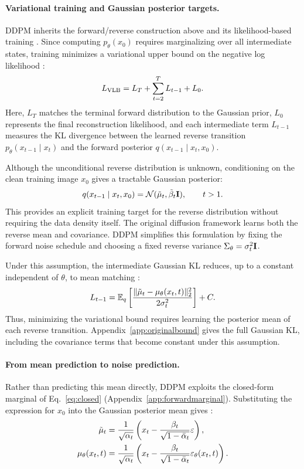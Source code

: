 \paragraph{Variational training and Gaussian posterior targets.}
DDPM inherits the forward/reverse construction above and its
likelihood-based training \cite{ho2020ddpm}. Since computing $p_\theta(x_0)$ requires
marginalizing over all intermediate states, training minimizes
a variational upper bound on the negative log likelihood
\cite[Eq.~5]{ho2020ddpm}:
\begin{equation}
L_{\rm VLB}
=L_T+\sum_{t=2}^{T}L_{t-1}+L_0.
\label{eq:vlbcomponents}
\end{equation}
Here, $L_T$ matches the terminal forward distribution to
the Gaussian prior, $L_0$ represents the final reconstruction
likelihood, and each intermediate term $L_{t-1}$ measures
the KL divergence between the learned reverse transition
$p_\theta(x_{t-1}\mid x_t)$ and the forward posterior
$q(x_{t-1}\mid x_t,x_0)$.

Although the unconditional reverse distribution is unknown,
conditioning on the clean training image $x_0$ gives a
tractable Gaussian posterior:
\begin{equation}
q(x_{t-1}\mid x_t,x_0)
=\mathcal{N}(\tilde{\mu}_t,\tilde{\beta}_t\mathbf{I}),
\qquad t>1.
\label{eq:forwardposterior}
\end{equation}
This provides an explicit training target for the reverse
distribution without requiring the data density itself.
The original diffusion framework learns both the reverse
mean and covariance. DDPM simplifies this formulation by
fixing the forward noise schedule and choosing a fixed
reverse variance $\Sigma_\theta=\sigma_t^2\mathbf{I}$.

Under this assumption, the intermediate Gaussian KL reduces,
up to a constant independent of $\theta$, to mean matching
\cite[Eq.~8]{ho2020ddpm}:
\begin{equation}
L_{t-1}
=\mathbb{E}_q\left[
\frac{\|\tilde{\mu}_t-\mu_\theta(x_t,t)\|_2^2}
{2\sigma_t^2}
\right]+C.
\label{eq:meanloss}
\end{equation}
Thus, minimizing the variational bound requires learning
the posterior mean of each reverse transition.
Appendix~\ref{app:originalbound} gives the full Gaussian KL, including
the covariance terms that become constant under this assumption.

\paragraph{From mean prediction to noise prediction.}
Rather than predicting this mean directly, DDPM exploits
the closed-form marginal of Eq.~\eqref{eq:closed}
(Appendix~\ref{app:forwardmarginal}).
Substituting the expression for $x_0$ into the Gaussian
posterior mean gives \cite[Eqs.~10--11]{ho2020ddpm}:
\begin{align}
\tilde{\mu}_t
&=\frac{1}{\sqrt{\alpha_t}}
\left(x_t-\frac{\beta_t}{\sqrt{1-\bar{\alpha}_t}}
\varepsilon\right),
\label{eq:posteriormean-noise}\\
\mu_\theta(x_t,t)
&=\frac{1}{\sqrt{\alpha_t}}
\left(x_t-\frac{\beta_t}{\sqrt{1-\bar{\alpha}_t}}
\varepsilon_\theta(x_t,t)\right).
\label{eq:ddpmmean}
\end{align}

